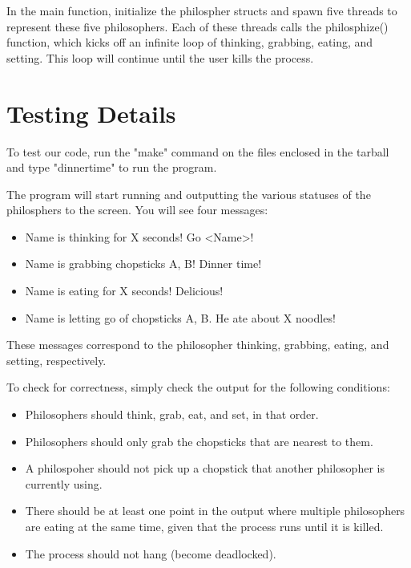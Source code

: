 \documentclass[letterpaper,10pt,titlepage]{article}
\begin{document}
In the main function, initialize the philospher structs and spawn five threads to represent these five philosophers.
Each of these threads calls the philosphize() function, which kicks off an infinite loop of thinking, grabbing, eating, and setting.
This loop will continue until the user kills the process.


\section {Testing Details}
To test our code, run the "make" command on the files enclosed in the tarball and type "dinnertime" to run the program. 

The program will start running and outputting the various statuses of the philosphers to the screen. 
You will see four messages:
\begin{itemize}
   \item Name is thinking for X seconds! Go <Name>!
   \item Name is grabbing chopsticks A, B! Dinner time!
   \item Name is eating for X seconds! Delicious!
   \item Name is letting go of chopsticks A, B. He ate about X noodles!
\end{itemize}

These messages correspond to the philosopher thinking, grabbing, eating, and setting, respectively.

To check for correctness, simply check the output for the following conditions:
\begin{itemize}
   \item Philosophers should think, grab, eat, and set, in that order.
   \item Philosophers should only grab the chopsticks that are nearest to them.
   \item A philospoher should not pick up a chopstick that another philosopher is currently using.
   \item There should be at least one point in the output where multiple philosophers are eating at the same time, given that the process runs until it is killed.
   \item The process should not hang (become deadlocked).
\end{itemize}
\end{document}
